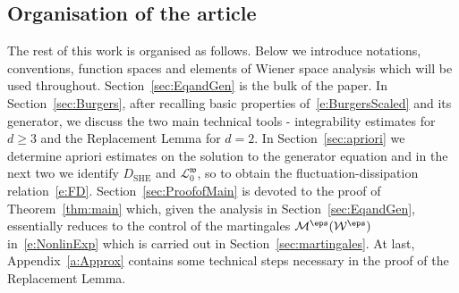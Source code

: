 \documentclass[reqno,11pt]{preprint}
\newcommand{\Weps}{\mathcal{W}^{\eps}}
\newcommand{\cL}{\mathcal{L}}
\newcommand{\cM}{\mathcal{M}}
\newcommand{\cN}{\mathcal{N}}
\newcommand{\fw}{\mathfrak{w}}
\newcommand{\1}{\mathds{1}}
\newcommand{\SHE}{\mathrm{SHE}}
\newcommand{\gen}{\cL^\eps}
\newcommand{\gensy}{\cL_0}
\begin{document}
%

\subsection*{Organisation of the article}

The rest of this work is organised as follows. 
Below we introduce notations, conventions, function spaces and 
elements of Wiener space analysis which will be used throughout. 
Section~\ref{sec:EqandGen} is the bulk of the paper. In Section~\ref{sec:Burgers}, 
after recalling basic properties of~\eqref{e:BurgersScaled} 
and its generator, we discuss the two main technical tools - integrability estimates for $d\geq 3$ and the 
Replacement Lemma for $d=2$. In Section~\ref{sec:apriori} we determine apriori estimates on the solution to the 
generator equation and in the next two we identify $D_\SHE$ and $\gensy^\fw$, 
so to obtain the fluctuation-dissipation relation~\eqref{e:FD}. 
Section~\ref{sec:ProofofMain} is devoted to the proof of Theorem~\ref{thm:main} which, 
given the analysis in Section~\ref{sec:EqandGen}, essentially reduces to the control of the 
martingales $\cM^\eps(\Weps)$ in~\eqref{e:NonlinExp} which is carried out in Section~\ref{sec:martingales}. 
At last, Appendix~\ref{a:Approx} contains some technical steps necessary in the proof of the 
Replacement Lemma. 
\end{document}
